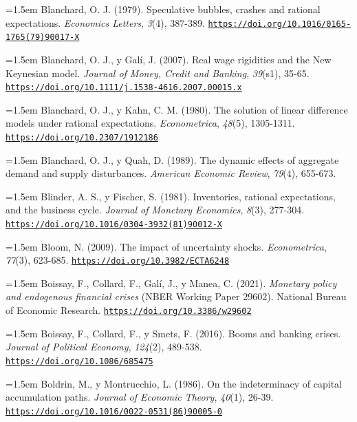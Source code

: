 \documentclass[10pt,a4paper]{article}
\begin{document}
\noindent\hangindent=1.5em Blanchard, O. J. (1979). Speculative bubbles, crashes and rational expectations. \textit{Economics Letters}, \textit{3}(4), 387-389. \href{https://doi.org/10.1016/0165-1765(79)90017-X}{\nolinkurl{https://doi.org/10.1016/0165-1765(79)90017-X}}

\noindent\hangindent=1.5em Blanchard, O. J., y Galí, J. (2007). Real wage rigidities and the New Keynesian model. \textit{Journal of Money, Credit and Banking}, \textit{39}(s1), 35-65. \href{https://doi.org/10.1111/j.1538-4616.2007.00015.x}{\nolinkurl{https://doi.org/10.1111/j.1538-4616.2007.00015.x}}

\noindent\hangindent=1.5em Blanchard, O. J., y Kahn, C. M. (1980). The solution of linear difference models under rational expectations. \textit{Econometrica}, \textit{48}(5), 1305-1311. \href{https://doi.org/10.2307/1912186}{\nolinkurl{https://doi.org/10.2307/1912186}}

\noindent\hangindent=1.5em Blanchard, O. J., y Quah, D. (1989). The dynamic effects of aggregate demand and supply disturbances. \textit{American Economic Review}, \textit{79}(4), 655-673.

\noindent\hangindent=1.5em Blinder, A. S., y Fischer, S. (1981). Inventories, rational expectations, and the business cycle. \textit{Journal of Monetary Economics}, \textit{8}(3), 277-304. \href{https://doi.org/10.1016/0304-3932(81)90012-X}{\nolinkurl{https://doi.org/10.1016/0304-3932(81)90012-X}}

{\sloppy\noindent\hangindent=1.5em Bloom, N. (2009). The impact of uncertainty shocks. \textit{Econometrica}, \textit{77}(3), 623-685. \href{https://doi.org/10.3982/ECTA6248}{\nolinkurl{https://doi.org/10.3982/ECTA6248}}\par}

\noindent\hangindent=1.5em Boissay, F., Collard, F., Galí, J., y Manea, C. (2021). \textit{Monetary policy and endogenous financial crises} (NBER Working Paper 29602). National Bureau of Economic Research. \href{https://doi.org/10.3386/w29602}{\nolinkurl{https://doi.org/10.3386/w29602}}

\noindent\hangindent=1.5em Boissay, F., Collard, F., y Smets, F. (2016). Booms and banking crises. \textit{Journal of Political Economy}, \textit{124}(2), 489-538. \href{https://doi.org/10.1086/685475}{\nolinkurl{https://doi.org/10.1086/685475}}

\noindent\hangindent=1.5em Boldrin, M., y Montrucchio, L. (1986). On the indeterminacy of capital accumulation paths. \textit{Journal of Economic Theory}, \textit{40}(1), 26-39. \href{https://doi.org/10.1016/0022-0531(86)90005-0}{\nolinkurl{https://doi.org/10.1016/0022-0531(86)90005-0}}
\end{document}
